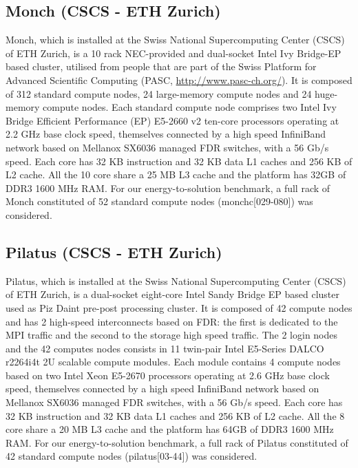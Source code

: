 \subsection{Monch (CSCS - ETH Zurich)}
Monch, which is installed  at the Swiss National Supercomputing Center
(CSCS) of ETH Zurich, is  a 10 rack NEC-provided and dual-socket Intel
Ivy Bridge-EP based cluster, utilised from people that are part of the
Swiss    Platform   for    Advanced   Scientific    Computing   (PASC,
\url{http://www.pasc-ch.org/}). It is composed of 312 standard compute
nodes, 24 large-memory compute nodes and 24 huge-memory compute nodes.
Each standard  compute node comprises  two Intel Ivy  Bridge Efficient
Performance (EP)  E5-2660 v2 ten-core processors operating  at 2.2 GHz
base  clock speed,  themselves connected  by a  high  speed InfiniBand
network based on Mellanox SX6036  managed FDR switches, with a 56 Gb/s
speed.  Each core  has 32 KB instruction and 32 KB  data L1 caches and
256 KB  of L2 cache. All  the 10 core share  a 25 MB L3  cache and the
platform has  32GB of  DDR3 1600 MHz  RAM. For  our energy-to-solution
benchmark, a  full rack  of Monch constituted  of 52  standard compute
nodes (monchc[029-080]) was considered.

\subsection{Pilatus (CSCS - ETH Zurich)}
Pilatus,  which  is installed  at  the  Swiss National  Supercomputing
Center (CSCS) of  ETH Zurich, is a dual-socket  eight-core Intel Sandy
Bridge EP based cluster used as Piz Daint pre-post processing cluster.
It is composed of 42  compute nodes and has 2 high-speed interconnects
based on FDR: the first is dedicated to the MPI traffic and the second
to  the storage  high speed  traffic.  The  2 login  nodes and  the 42
computes nodes consists in 11 twin-pair Intel E5-Series DALCO r2264i4t
2U  scalable compute modules.   Each module  contains 4  compute nodes
based on two  Intel Xeon E5-2670 processors operating  at 2.6 GHz base
clock speed,  themselves connected by a high  speed InfiniBand network
based  on  Mellanox  SX6036  managed  FDR switches,  with  a  56  Gb/s
speed. Each  core has 32 KB instruction  and 32 KB data  L1 caches and
256 KB  of L2 cache.  All  the 8 core share  a 20 MB L3  cache and the
platform has  64GB of  DDR3 1600 MHz  RAM. For  our energy-to-solution
benchmark, a full  rack of Pilatus constituted of  42 standard compute
nodes (pilatus[03-44]) was considered.

